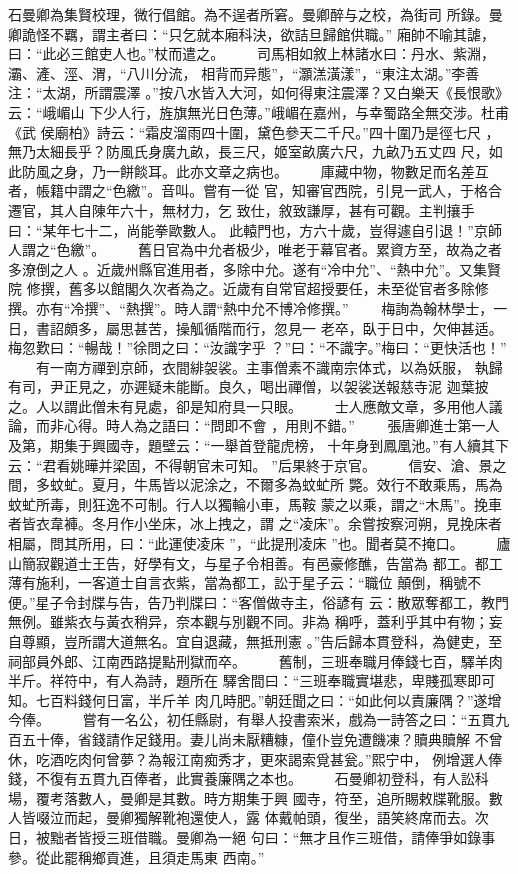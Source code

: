 \documentclass{ctexart}
\begin{document}
石曼卿為集賢校理，微行倡館。為不逞者所窘。曼卿醉与之校，為街司 所錄。曼卿詭怪不羈，謂主者曰：``只乞就本廂科決，欲詰旦歸館供職。'' 廂帥不喻其謔，曰：``此必三館吏人也。''杖而遣之。 　　司馬相如敘上林諸水曰：丹水、紫淵，灞、滻、涇、渭，``八川分流， 相背而异態''，``灝溔潢漾''，``東注太湖。''李善注：``太湖，所謂震澤 。''按八水皆入大河，如何得東注震澤？又白樂天《長恨歌》云：``峨嵋山 下少人行，旌旗無光日色薄。''峨嵋在嘉州，与幸蜀路全無交涉。杜甫《武 侯廟柏》詩云：``霜皮溜雨四十圍，黛色參天二千尺。''四十圍乃是徑七尺 ，無乃太細長乎？防風氏身廣九畝，長三尺，姬室畝廣六尺，九畝乃五丈四 尺，如此防風之身，乃一餅餤耳。此亦文章之病也。 　　庫藏中物，物數足而名差互者，帳籍中謂之``色繳''。音叫。嘗有一從 官，知審官西院，引見一武人，于格合遷官，其人自陳年六十，無材力，乞 致仕，敘致謙厚，甚有可觀。主判攘手曰：``某年七十二，尚能拳歐數人。 此轅門也，方六十歲，豈得遽自引退！''京師人謂之``色繳''。 　　舊日官為中允者极少，唯老于幕官者。累資方至，故為之者多潦倒之人 。近歲州縣官進用者，多除中允。遂有``冷中允''、``熱中允''。又集賢院 修撰，舊多以館閣久次者為之。近歲有自常官超授要任，未至從官者多除修 撰。亦有``冷撰''、``熱撰''。時人謂``熱中允不博冷修撰。'' 　　梅詢為翰林學士，一日，書詔頗多，屬思甚苦，操觚循階而行，忽見一 老卒，臥于日中，欠伸甚适。梅忽歎曰：``暢哉！''徐問之曰：``汝識字乎 ？''曰：``不識字。''梅曰：``更快活也！'' 　　有一南方禪到京師，衣間緋袈裟。主事僧素不識南宗体式，以為妖服， 執歸有司，尹正見之，亦遲疑未能斷。良久，喝出禪僧，以袈裟送報慈寺泥 迦葉披之。人以謂此僧未有見處，卻是知府具一只眼。 　　士人應敵文章，多用他人議論，而非心得。時人為之語曰：``問即不會 ，用則不錯。'' 　　張唐卿進士第一人及第，期集于興國寺，題壁云：``一舉首登龍虎榜， 十年身到鳳凰池。''有人續其下云：``君看姚曄并梁固，不得朝官未可知。 ''后果終于京官。 　　信安、滄、景之間，多蚊虻。夏月，牛馬皆以泥涂之，不爾多為蚊虻所 斃。效行不敢乘馬，馬為蚊虻所毒，則狂逸不可制。行人以獨輪小車，馬鞍 蒙之以乘，謂之``木馬''。挽車者皆衣韋褲。冬月作小坐床，冰上拽之，謂 之``凌床''。余嘗按察河朔，見挽床者相屬，問其所用，曰：``此運使凌床 ''，``此提刑凌床 ''也。聞者莫不掩口。 　　廬山簡寂觀道士王告，好學有文，与星子令相善。有邑豪修醮，告當為 都工。都工薄有施利，一客道士自言衣紫，當為都工，訟于星子云：``職位 顛倒，稱號不便。''星子令封牒与告，告乃判牒曰：``客僧做寺主，俗諺有 云：散眾奪都工，教門無例。雖紫衣与黃衣稍异，奈本觀与別觀不同。非為 稱呼，蓋利乎其中有物；妄自尊顯，豈所謂大道無名。宜自退藏，無抵刑憲 。''告后歸本貫登科，為健吏，至祠部員外郎、江南西路提點刑獄而卒。 　　舊制，三班奉職月俸錢七百，驛羊肉半斤。祥符中，有人為詩，題所在 驛舍間曰：``三班奉職實堪悲，卑賤孤寒即可知。七百料錢何日富，半斤羊 肉几時肥。''朝廷聞之曰：``如此何以責廉隅？''遂增今俸。 　　嘗有一名公，初任縣尉，有舉人投書索米，戲為一詩答之曰：``五貫九 百五十俸，省錢請作足錢用。妻儿尚未厭糟糠，僮仆豈免遭饑凍？贖典贖解 不曾休，吃酒吃肉何曾夢？為報江南痴秀才，更來謁索覓甚瓮。''熙宁中， 例增選人俸錢，不復有五貫九百俸者，此實養廉隅之本也。 　　石曼卿初登科，有人訟科場，覆考落數人，曼卿是其數。時方期集于興 國寺，符至，追所賜敕牒靴服。數人皆啜泣而起，曼卿獨解靴袍還使人，露 体戴帕頭，復坐，語笑終席而去。次日，被黜者皆授三班借職。曼卿為一絕 句曰：``無才且作三班借，請俸爭如錄事參。從此罷稱鄉貢進，且須走馬東 西南。'' 
\end{document}
